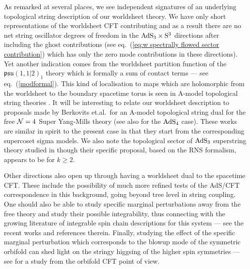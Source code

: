 \documentclass[12pt,a4paper]{article}
\begin{document}
As remarked at several places, we see independent signatures of an underlying topological string description of our worldsheet theory. We have only short representations of the worldsheet CFT contributing and as a result there are no net string oscillator degrees of freedom in the  ${\rm AdS}_3\times {\rm S}^3$ directions after including the ghost contributions (see eq.~(\ref{eq:w spectrally flowed sector contribution}) which has only the zero mode contributions in these directions). Yet another indication comes from the 
worldsheet partition function of the $\mathfrak{psu}(1,1|2)_1$ theory which is formally a sum of contact terms ---  see eq.~(\ref{modformal}). This kind of localisation to maps which are holomorphic from the worldsheet to the boundary spacetime torus is seen in A-model topological string theories \cite{Bershadsky:1993ta}. It will be interesting to relate our worldsheet description to proposals made by Berkovits et.al.\ for an A-model topological string dual for the free ${\cal N}=4$ Super Yang-Mills theory \cite{Berkovits:2007zk, Berkovits:2007rj, Berkovits:2008qc, Berkovits:2008ga} (see also \cite{Bonelli:2008us} for the ${\rm AdS}_4$ case). These works are similar in spirit to the present case in that they start from the corresponding supercoset sigma models. We also note the topological sector of ${\rm AdS}_3$ superstring theory studied in \cite{Sugawara:1999fq, Rastelli:2005ph} though their specific proposal, based on the RNS formalism, appears to be for $k\geq 2$. 
  
Other directions also open up through having a worldsheet dual to the spacetime CFT.  These include the possibility of much more refined tests of the AdS/CFT correspondence in this background, going beyond tree level in string coupling. One should also be able to study specific marginal perturbations away from the free theory and study their possible integrability, thus connecting with the growing literature of integrable spin chain descriptions for this system --- see the recent works \cite{Baggio:2018gct, OhlssonSax:2018hgc, Dei:2018mfl} and references therein. Finally, studying the effect of the specific marginal perturbation which corresponds to the blowup mode of the symmetric orbifold can shed light on the stringy higgsing of the higher spin symmetries --- see \cite{Gaberdiel:2015uca} for a study from the orbifold CFT point of view.   

%  
\end{document}

